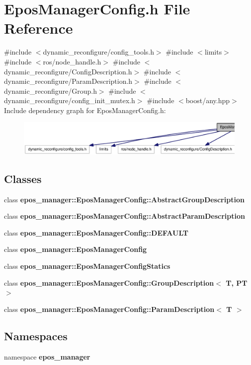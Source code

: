 \section{\-Epos\-Manager\-Config.\-h \-File \-Reference}
\label{EposManagerConfig_8h}
{\ttfamily \#include $<$dynamic\-\_\-reconfigure/config\-\_\-tools.\-h$>$}\*
{\ttfamily \#include $<$limits$>$}\*
{\ttfamily \#include $<$ros/node\-\_\-handle.\-h$>$}\*
{\ttfamily \#include $<$dynamic\-\_\-reconfigure/\-Config\-Description.\-h$>$}\*
{\ttfamily \#include $<$dynamic\-\_\-reconfigure/\-Param\-Description.\-h$>$}\*
{\ttfamily \#include $<$dynamic\-\_\-reconfigure/\-Group.\-h$>$}\*
{\ttfamily \#include $<$dynamic\-\_\-reconfigure/config\-\_\-init\-\_\-mutex.\-h$>$}\*
{\ttfamily \#include $<$boost/any.\-hpp$>$}\*
\-Include dependency graph for \-Epos\-Manager\-Config.\-h\-:
\nopagebreak
\begin{figure}[H]
\begin{center}
\leavevmode
\includegraphics[width=350pt]{EposManagerConfig_8h__incl}
\end{center}
\end{figure}
\subsection*{\-Classes}
\begin{DoxyCompactItemize}
\item 
class {\bf epos\-\_\-manager\-::\-Epos\-Manager\-Config\-::\-Abstract\-Group\-Description}
\item 
class {\bf epos\-\_\-manager\-::\-Epos\-Manager\-Config\-::\-Abstract\-Param\-Description}
\item 
class {\bf epos\-\_\-manager\-::\-Epos\-Manager\-Config\-::\-D\-E\-F\-A\-U\-L\-T}
\item 
class {\bf epos\-\_\-manager\-::\-Epos\-Manager\-Config}
\item 
class {\bf epos\-\_\-manager\-::\-Epos\-Manager\-Config\-Statics}
\item 
class {\bf epos\-\_\-manager\-::\-Epos\-Manager\-Config\-::\-Group\-Description$<$ T, P\-T $>$}
\item 
class {\bf epos\-\_\-manager\-::\-Epos\-Manager\-Config\-::\-Param\-Description$<$ T $>$}
\end{DoxyCompactItemize}
\subsection*{\-Namespaces}
\begin{DoxyCompactItemize}
\item 
namespace {\bf epos\-\_\-manager}
\end{DoxyCompactItemize}
